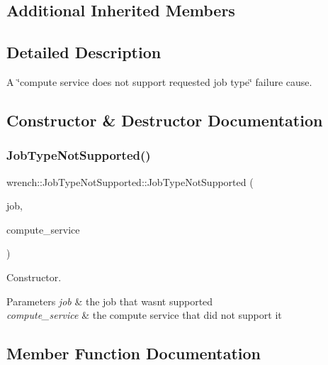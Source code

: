 \subsection*{Additional Inherited Members}


\subsection{Detailed Description}
A \char`\"{}compute service does not support requested job type\char`\"{} failure cause. 

\subsection{Constructor \& Destructor Documentation}
\mbox{\label{classwrench_1_1_job_type_not_supported_a778c9a1bf5fb19b3e380fa9e8c6a4120}} 
\subsubsection{\texorpdfstring{Job\+Type\+Not\+Supported()}{JobTypeNotSupported()}}
{\footnotesize\ttfamily wrench\+::\+Job\+Type\+Not\+Supported\+::\+Job\+Type\+Not\+Supported (\begin{DoxyParamCaption}\item[{\hyperlink{classwrench_1_1_workflow_job}{Workflow\+Job} $\ast$}]{job,  }\item[{\hyperlink{classwrench_1_1_compute_service}{Compute\+Service} $\ast$}]{compute\+\_\+service }\end{DoxyParamCaption})}



Constructor. 


\begin{DoxyParams}{Parameters}
{\em job} & the job that wasn\textquotesingle{}t supported \\
\hline
{\em compute\+\_\+service} & the compute service that did not support it \\
\hline
\end{DoxyParams}


\subsection{Member Function Documentation}
\mbox{\label{classwrench_1_1_job_type_not_supported_af2875bcec00418cd655609f1b4f12e55}} 
